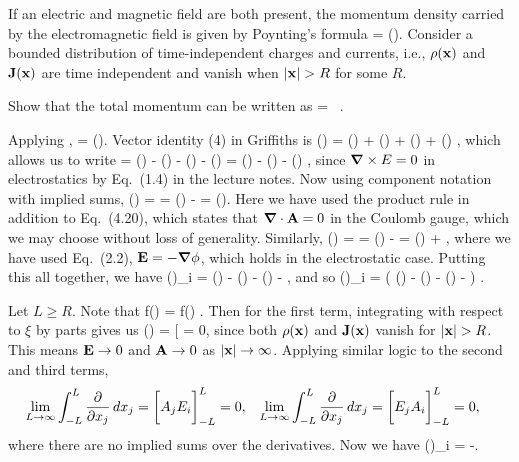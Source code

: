 \begin{statement}{}
	If an electric and magnetic field are both present, the momentum density carried by the electromagnetic field is given by Poynting's formula
	\beq
		\vcP =  (\vE \times \vB).
	\eeq
	Consider a bounded distribution of time-independent charges and currents, i.e., $\rho(\vb{x})$ and $\vb{J}(\vb{x})$ are time independent and vanish when $\abs{\vb{x}} > R$ for some $R$.
\end{statement}

\begin{problem}
	Show that the total momentum can be written as
	\beq
		\vP \equiv \int \vcPx \dcx
		= \int \phix \, \vJx \dcx.
	\eeq
\end{problem}

\begin{solution}
	Applying ,
	\beq
		\vE \times \vB = \vE \times (\grad \times \vA).
	\eeq
	Vector identity (4) in Griffiths is
	\beq
		\grad(\vaa \cdot \vbb) = \vaa \times (\grad \times \vbb) + \vbb \times (\grad \times \vaa) + (\vaa \cdot \grad) \vbb + (\vbb \cdot \grad) \vaa,
	\eeq
	which allows us to write
	\beq
		\vE \times \vB = \grad(\vA \cdot \vE) - \vA \times (\grad \times \vE) - (\vA \cdot \grad) \vE - (\vE \cdot \grad) \vA \notag
		= \grad(\vA \cdot \vE) - (\vA \cdot \grad) \vE - (\vE \cdot \grad) \vA,
	\eeq
	since $\grad \times E = 0$ in electrostatics by Eq.~(1.4) in the lecture notes.  Now using component notation with implied sums,
	\beq
		(\vA \cdot \grad) \Ei = \Aj \pdv{\Ei}{\xj} = \pdv{}{\xj} (\Aj \Ei) - \Ei \pdv{\Aj}{\xj}
		= \pdv{}{\xj} (\Aj \Ei).
	\eeq
	Here we have used the product rule in addition to Eq.~(4.20), which states that $\grad \cdot \vb{A} = 0$ in the Coulomb gauge, which we may choose without loss of generality.  Similarly,
	\beq
		(\vE \cdot \grad) \Ai = \Ej \pdv{\Ai}{\xj} = \pdv{}{\xj} (\Ej \Ai) - \Ai \pdv{\Ej}{\xj}
		= \pdv{}{\xj} (\Ej \Ai) + \Ai \lap\phi,
	\eeq
	where we have used Eq.~(2.2), $\vb{E} = -\grad\phi$, which holds in the electrostatic case.  Putting this all together, we have
	\beq
		(\vE \times \vB)_i = \pdv{}{\xi} (\Aj \Ej) - \pdv{}{\xj} (\Aj \Ei) - \pdv{}{\xj} (\Ej \Ai) - \Ai \lap\phi,
	\eeq
	and so
	\beq
		\int (\vE \times \vB)_i \dcx = \int \left( \pdv{}{\xi} (\Aj \Ej) - \pdv{}{\xj} (\Aj \Ei) - \pdv{}{\xj} (\Ej \Ai) - \Ai \lap\phi \right) \dcx.
	\eeq
	
	Let $L \geq R$.  Note that
	\beq
		\int f(\vx) \dcx = \limLi \intLL \intLL \intLL f(\vx)   .
	\eeq
	Then for the first term, integrating with respect to $\xi$ by parts gives us
	\beq
		\limLi \intLL \pdv{}{\xi} (\Aj \Ej) \dxi = \bigg[ \Aj \Ej \bigLL = 0,
	\eeq
	since both $\rho(\vb{x})$ and $\vb{J}(\vb{x})$ vanish for $\abs{\vb{x}} > R$.  This means $\vb{E} \to 0$ and $\vb{A} \to 0$ as $\abs{\vb{x}} \to \infty$.  Applying similar logic to the second and third terms,
	\begin{align*}
		\lim_{L \to \infty} \int_{-L}^L \pdv{}{x_j} (A_j E_i) \dd{x_j} &= \bigg[ A_j E_i \bigg]_{-L}^L = 0, &
		\lim_{L \to \infty} \int_{-L}^L \pdv{}{x_j} (E_j A_i) \dd{x_j} &= \bigg[ E_j A_i \bigg]_{-L}^L = 0,
	\end{align*}
	where there are no implied sums over the derivatives.  Now we have
	\beq
		\int (\vE \times \vB)_i \dcx = -\int \Ai \lap\phi \dcx.
	\eeq
	

\end{solution}
